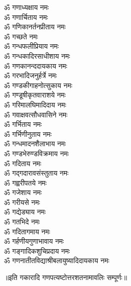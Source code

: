 \begin{flushleft}
\begin{multicols}{2}
ॐ गणाध्यक्षाय नमः\\
ॐ गणार्चिताय नमः\\
ॐ गणिकानर्तनप्रीताय नमः\\
ॐ गच्छते नमः\\
ॐ गन्धफलीप्रियाय नमः\\
ॐ गन्धकादिरसाधीशाय नमः\\
ॐ गणकानन्ददायकाय नमः\\
ॐ गरभादिजनुर्हर्त्रे नमः\\
ॐ गण्डकीगाहनोत्सुकाय नमः\hfill{}\\
ॐ गण्डूषीकृतवाराशये नमः\\
ॐ गरिमालघिमादिदाय नमः\\
ॐ गवाक्षवत्सौधवासिने नमः\\
ॐ गर्भिताय नमः\\
ॐ गर्भिणीनुताय नमः\\
ॐ गन्धमादनशैलाभाय नमः\\
ॐ गण्डभेरुण्डविक्रमाय नमः\\
ॐ गदिताय नमः\\
ॐ गद्गदारावसंस्तुताय नमः\\
ॐ गह्वरीपतये नमः\hfill{}\\
ॐ गजेशाय नमः\\
ॐ गरीयसे नमः\\
ॐ गद्येड्याय नमः\\
ॐ गतभिदे नमः\\
ॐ गदितागमाय नमः\\
ॐ गर्हणीयगुणाभावाय नमः\\
ॐ गङ्गादिकशुचिप्रदाय नमः\\
ॐ गणनातीतविद्याश्रीबलायुष्यादिदायकाय नमः\\
\end{multicols}
\end{flushleft}
\centerline{॥इति गकारादि गणपत्यष्टोत्तरशतनामावलिः सम्पूर्णः॥}
